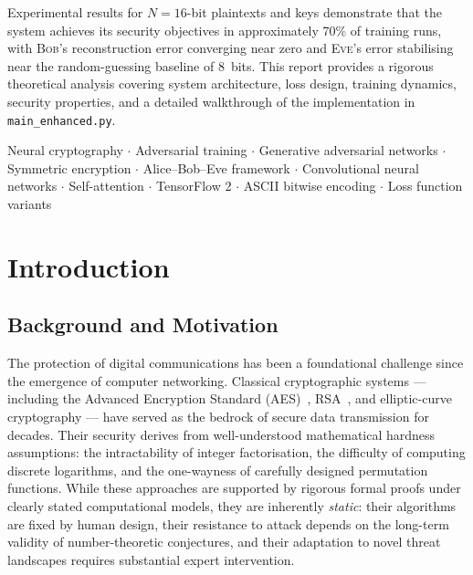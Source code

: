 \documentclass[12pt, a4paper]{article}
\newcommand{\bob}{\textsc{Bob}}
\newcommand{\eve}{\textsc{Eve}}
\newcommand{\code}[1]{\texttt{\color{CodeRed}#1}}
\newcommand{\N}{N}                 %
\begin{document}
Experimental results for $\N = 16$-bit plaintexts and keys demonstrate
that the system achieves its security objectives in approximately 70\% of
training runs, with \bob{}'s reconstruction error converging near zero and
\eve{}'s error stabilising near the random-guessing baseline of 8~bits.
This report provides a rigorous theoretical analysis covering system
architecture, loss design, training dynamics, security properties, and a
detailed walkthrough of the implementation in \code{main\_enhanced.py}.

\bigskip
\noindent
\begin{tcolorbox}[contribbox, title={Keywords}]
  Neural cryptography $\cdot$ Adversarial training $\cdot$
  Generative adversarial networks $\cdot$ Symmetric encryption $\cdot$
  Alice–Bob–Eve framework $\cdot$ Convolutional neural networks $\cdot$
  Self-attention $\cdot$ TensorFlow 2 $\cdot$ ASCII bitwise encoding $\cdot$
  Loss function variants
\end{tcolorbox}

\newpage
\section{Introduction}
\label{sec:intro}

\subsection{Background and Motivation}
\label{subsec:background}

The protection of digital communications has been a foundational challenge
since the emergence of computer networking. Classical cryptographic
systems — including the Advanced Encryption Standard
(AES)~\cite{daemen2002aes}, RSA~\cite{rivest1978rsa}, and elliptic-curve
cryptography — have served as the bedrock of secure data transmission for
decades. Their security derives from well-understood mathematical hardness
assumptions: the intractability of integer factorisation, the difficulty
of computing discrete logarithms, and the one-wayness of carefully
designed permutation functions. While these approaches are supported by
rigorous formal proofs under clearly stated computational models, they are
inherently \emph{static}: their algorithms are fixed by human design,
their resistance to attack depends on the long-term validity of
number-theoretic conjectures, and their adaptation to novel threat
landscapes requires substantial expert intervention.
\end{document}

